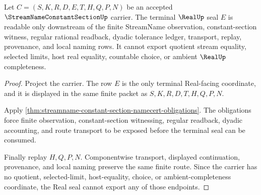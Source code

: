 \begin{theorem}
\label{thm:streamname-constant-section-real-seal-boundary}
Let $C=(S,K,R,D,E,T,H,Q,P,N)$ be an accepted $\StreamNameConstantSectionUp$ carrier. The terminal $\RealUp$ seal $E$ is readable only downstream of the finite StreamName observation, constant-section witness, regular rational readback, dyadic tolerance ledger, transport, replay, provenance, and local naming rows. It cannot export quotient stream equality, selected limits, host real equality, countable choice, or ambient $\RealUp$ completeness.
\end{theorem}
\begin{proof}
Project the carrier. The row $E$ is the only terminal Real-facing coordinate, and it is displayed in the same finite packet as $S,K,R,D,T,H,Q,P,N$.

Apply \autoref{thm:streamname-constant-section-namecert-obligations}. The obligations force finite observation, constant-section witnessing, regular readback, dyadic accounting, and route transport to be exposed before the terminal seal can be consumed.

Finally replay $H,Q,P,N$. Componentwise transport, displayed continuation, provenance, and local naming preserve the same finite route. Since the carrier has no quotient, selected-limit, host-equality, choice, or ambient-completeness coordinate, the Real seal cannot export any of those endpoints.
\end{proof}


\begin{closurestatus}{\StreamNameConstantSectionUp}
  \theoryclosure{\seedClosure}
  \formalstatus{\unformalizedV}
\end{closurestatus}
